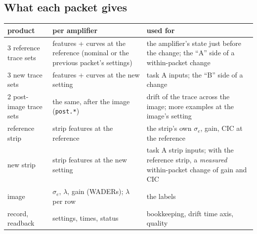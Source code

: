 \documentclass[11pt]{article}
\begin{document}
\subsection{What each packet gives}
\begin{center}\small
\begin{tabular}{p{4.2cm}p{4.0cm}p{6.8cm}}\toprule
product & per amplifier & used for\\\midrule
3 reference trace sets & features + curves at the reference (nominal or the previous packet's settings) & the amplifier's state just before the change; the ``A'' side of a within-packet change\\
3 new trace sets & features + curves at the new setting & task A inputs; the ``B'' side of a change\\
2 post-image trace sets & the same, after the image (\texttt{post.*}) & drift of the trace across the image; more examples at the image's setting\\
reference strip & strip features at the reference & the strip's own $\sigma_e$, gain, CIC at the reference\\
new strip & strip features at the new setting & task A strip inputs; with the reference strip, a \emph{measured} within-packet change of gain and CIC\\
image & $\sigma_e$, $\lambda$, gain (WADERs); $\lambda$ per row & the labels\\
record, readback & settings, times, status & bookkeeping, drift time axis, quality\\\bottomrule
\end{tabular}
\end{center}
\end{document}
